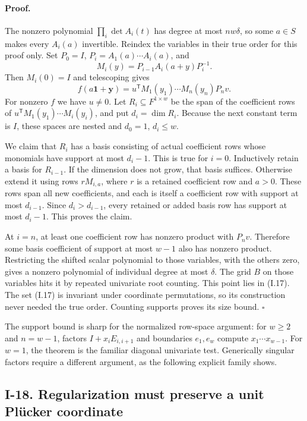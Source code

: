 \documentclass[11pt,a4paper]{article}
\theoremstyle{definition}\newtheorem{definition}{Definition}
\begin{document}
\paragraph{Proof.}
The nonzero polynomial $\prod_i\det A_i(t)$ has degree at most
$nw\delta$, so some $a\in S$ makes every $A_i(a)$ invertible.
Reindex the variables in their true order for this proof only.
Set $P_0=I$, $P_i=A_1(a)\cdots A_i(a)$, and
\[
 M_i(y)=P_{i-1}A_i(a+y)P_i^{-1}.
\]
Then $M_i(0)=I$ and telescoping gives
\[
 f(a\mathbf1+\mathbf y)
    =u^{\mathsf T}M_1(y_1)\cdots M_n(y_n)P_nv.
\]
For nonzero $f$ we have $u\ne0$.  Let $R_i\subseteq F^{1\times w}$
be the span of the coefficient rows of
$u^{\mathsf T}M_1(y_1)\cdots M_i(y_i)$, and put $d_i=\dim R_i$.
Because the next constant term is $I$, these spaces are nested and
$d_0=1$, $d_i\le w$.

We claim that $R_i$ has a basis consisting of actual coefficient
rows whose monomials have support at most $d_i-1$.  This is true for
$i=0$.  Inductively retain a basis for $R_{i-1}$.  If the dimension
does not grow, that basis suffices.  Otherwise extend it using rows
$rM_{i,a}$, where $r$ is a retained coefficient row and $a>0$.
These rows span all new coefficients, and each is itself a coefficient
row with support at most $d_{i-1}$.  Since $d_i>d_{i-1}$, every
retained or added basis row has support at most $d_i-1$.
This proves the claim.

At $i=n$, at least one coefficient row has nonzero product with
$P_nv$.  Therefore some basis coefficient of support at most $w-1$
also has nonzero product.  Restricting the shifted scalar polynomial
to those variables, with the others zero, gives a nonzero polynomial
of individual degree at most $\delta$.  The grid $B$ on those
variables hits it by repeated univariate root counting.  This point
lies in (I.17).  The set (I.17) is invariant under coordinate
permutations, so its construction never needed the true order.
Counting supports proves its size bound. \hfill$\square$

The support bound is sharp for the normalized row-space argument:
for $w\ge2$ and $n=w-1$, factors $I+x_iE_{i,i+1}$ and boundaries $e_1,e_w$
compute $x_1\cdots x_{w-1}$.  For $w=1$, the theorem is the familiar
diagonal univariate test.  Generically singular factors require a
different argument, as the following explicit family shows.

\subsection{I-18. Regularization must preserve a unit Pl\"ucker coordinate}
\label{I-18}
\end{document}
